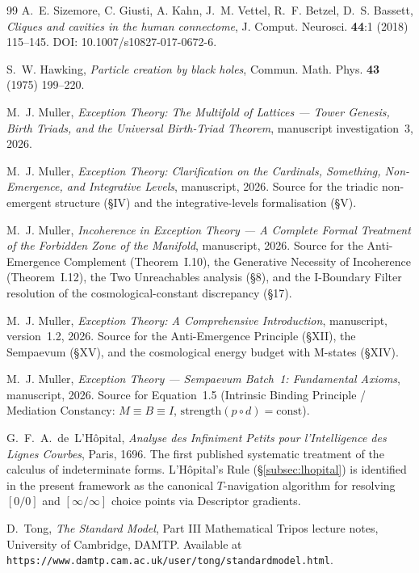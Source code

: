 \documentclass[11pt,a4paper]{article}
\theoremstyle{definition}
\theoremstyle{remark}
\begin{document}
\begin{thebibliography}{99}
A.~E. Sizemore, C. Giusti, A. Kahn, J.~M. Vettel, R.~F. Betzel, D.~S. Bassett,
\emph{Cliques and cavities in the human connectome},
J. Comput. Neurosci. {\bf 44}:1 (2018) 115--145.
DOI: 10.1007/s10827-017-0672-6.

S.~W. Hawking,
\emph{Particle creation by black holes},
Commun. Math. Phys. {\bf 43} (1975) 199--220.

M.~J. Muller,
\emph{Exception Theory: The Multifold of Lattices --- Tower Genesis, Birth Triads, and the Universal Birth-Triad Theorem}, manuscript investigation~3, 2026.

M.~J. Muller,
\emph{Exception Theory: Clarification on the Cardinals, Something, Non-Emergence, and Integrative Levels}, manuscript, 2026.
Source for the triadic non-emergent structure (\S IV) and the integrative-levels formalisation (\S V).

M.~J. Muller,
\emph{Incoherence in Exception Theory --- A Complete Formal Treatment of the Forbidden Zone of the Manifold}, manuscript, 2026.
Source for the Anti-Emergence Complement (Theorem~I.10), the Generative Necessity of Incoherence (Theorem~I.12), the Two Unreachables analysis (\S 8), and the I-Boundary Filter resolution of the cosmological-constant discrepancy (\S 17).

M.~J. Muller,
\emph{Exception Theory: A Comprehensive Introduction}, manuscript, version~1.2, 2026.
Source for the Anti-Emergence Principle (\S XII), the Sempaevum (\S XV), and the cosmological energy budget with M-states (\S XIV).

M.~J. Muller,
\emph{Exception Theory --- Sempaevum Batch~1: Fundamental Axioms}, manuscript, 2026.
Source for Equation~1.5 (Intrinsic Binding Principle / Mediation Constancy: $M \equiv B \equiv I$, $\mathrm{strength}(p \circ d) = \mathrm{const}$).

G.~F.~A.~de~L'H\^opital,
\emph{Analyse des Infiniment Petits pour l'Intelligence des Lignes Courbes},
Paris, 1696.
The first published systematic treatment of the calculus of indeterminate forms. L'H\^opital's Rule (\S\ref{subsec:lhopital}) is identified in the present framework as the canonical $T$-navigation algorithm for resolving $[0/0]$ and $[\infty/\infty]$ choice points via Descriptor gradients.

D.~Tong,
\emph{The Standard Model},
Part III Mathematical Tripos lecture notes, University of Cambridge, DAMTP.
Available at \texttt{https://www.damtp.cam.ac.uk/user/tong/standardmodel.html}.


\end{thebibliography}
\end{document}
